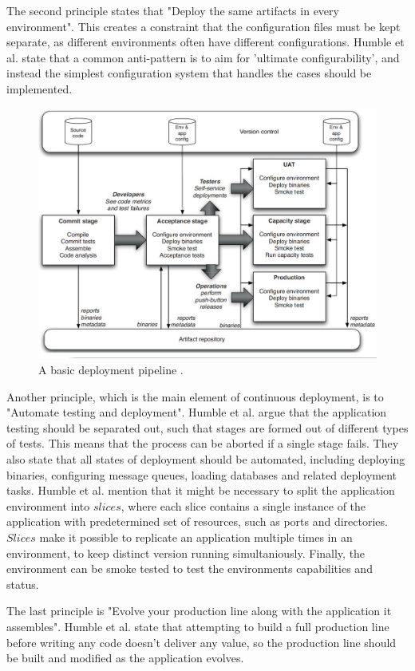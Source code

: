 \documentclass[english, grading]{tktltiki2}
\theoremstyle{definition}
\theoremstyle{remark}
\begin{document}
The second principle states that "Deploy the same artifacts in every environment". This creates a constraint that the configuration files must be kept separate, as different environments often have different configurations. Humble et al. state that a common anti-pattern is to aim for 'ultimate configurability', and instead the simplest configuration system that handles the cases should be implemented.
\begin{figure}[h]
	\centering
	\includegraphics[width=5.0in]{pipeline.jpg}
	\caption{A basic deployment pipeline \cite{cdbook}.}
	\label{fig3}
\end{figure}
Another principle, which is the main element of continuous deployment, is to "Automate testing and deployment". Humble et al. argue that the application testing should be separated out, such that stages are formed out of different types of tests. This means that the process can be aborted if a single stage fails. They also state that all states of deployment should be automated, including deploying binaries, configuring message queues, loading databases and related deployment tasks. Humble et al. mention that it might be necessary to split the application environment into $slices$, where each slice contains a single instance of the application with predetermined set of resources, such as ports and directories. $Slices$ make it possible to replicate an application multiple times in an environment, to keep distinct version running simultaniously. Finally, the environment can be smoke tested to test the environments capabilities and status.

The last principle is "Evolve your production line along with the application it assembles". Humble et al. state that attempting to build a full production line before writing any code doesn't deliver any value, so the production line should be built and modified as the application evolves. 
\end{document}
